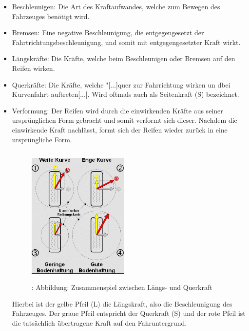 				\begin{itemize}
					\item Beschleunigen: Die Art des Kraftaufwandes, welche zum Bewegen des Fahrzeuges benötigt wird.
					\item Bremsen: Eine negative Beschleunigung, die entgegengesetzt der Fahrtrichtungsbeschleunigung, und somit mit entgegengesetzter Kraft wirkt.
					\item Längskräfte: Die Kräfte, welche beim Beschleunigen oder Bremsen auf den Reifen wirken.
					\item Querkräfte: Die Kräfte, welche "[...]quer zur Fahrrichtung wirken un dbei Kurvenfahrt auftreten[...].\cite{TS18} Wird oftmals auch als Seitenkraft (S) bezeichnet.
					\item Verformung: Der Reifen wird durch die einwirkenden Kräfte aus seiner ursprünglichen Form gebracht und somit verformt sich dieser. Nachdem die einwirkende Kraft nachlässt, formt sich der Reifen wieder zurück in eine ursprüngliche Form.
					
					\begin{figure}
						\centering
						\includegraphics[width=5cm, height=7cm] {l_qkraft.png}
						\caption {\cite{TS19}: Abbildung: Zusammenspiel zwischen Längs- und Querkraft}
					\end{figure}
					
					\begin{flushleft}
						Hierbei ist der gelbe Pfeil (L) die Längskraft, also die Beschleunigung des Fahrzeuges.
						Der graue Pfeil entspricht der Querkraft (S) und der rote Pfeil ist die tatsächlich übertragene Kraft auf den Fahruntergrund.\\
					\end{flushleft}
					  
				\end{itemize}
			
